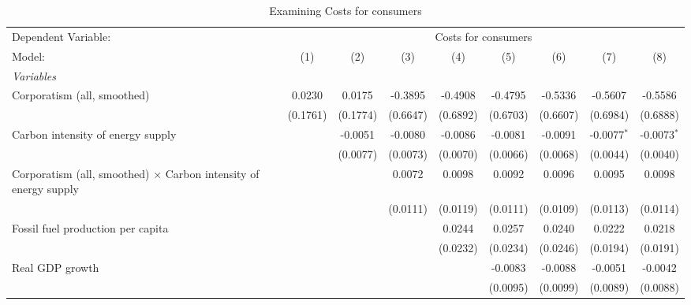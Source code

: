 
\begin{table}[htbp]
   \caption{Examining Costs for consumers}
   \centering
   \begin{tabular}{lcccccccc}
      \tabularnewline \midrule \midrule
      Dependent Variable: & \multicolumn{8}{c}{Costs for consumers}\\
      Model:                                                                  & (1)      & (2)      & (3)      & (4)      & (5)      & (6)      & (7)           & (8)\\  
      \midrule
      \emph{Variables}\\
      Corporatism (all, smoothed)                                             & 0.0230   & 0.0175   & -0.3895  & -0.4908  & -0.4795  & -0.5336  & -0.5607       & -0.5586\\   
                                                                              & (0.1761) & (0.1774) & (0.6647) & (0.6892) & (0.6703) & (0.6607) & (0.6984)      & (0.6888)\\   
      Carbon intensity of energy supply                                       &          & -0.0051  & -0.0080  & -0.0086  & -0.0081  & -0.0091  & -0.0077$^{*}$ & -0.0073$^{*}$\\   
                                                                              &          & (0.0077) & (0.0073) & (0.0070) & (0.0066) & (0.0068) & (0.0044)      & (0.0040)\\   
      Corporatism (all, smoothed) $\times$ Carbon intensity of energy supply  &          &          & 0.0072   & 0.0098   & 0.0092   & 0.0096   & 0.0095        & 0.0098\\   
                                                                              &          &          & (0.0111) & (0.0119) & (0.0111) & (0.0109) & (0.0113)      & (0.0114)\\   
      Fossil fuel production per capita                                       &          &          &          & 0.0244   & 0.0257   & 0.0240   & 0.0222        & 0.0218\\   
                                                                              &          &          &          & (0.0232) & (0.0234) & (0.0246) & (0.0194)      & (0.0191)\\   
      Real GDP growth                                                         &          &          &          &          & -0.0083  & -0.0088  & -0.0051       & -0.0042\\   
                                                                              &          &          &          &          & (0.0095) & (0.0099) & (0.0089)      & (0.0088)\\   

\end{tabular}
\end{table}

